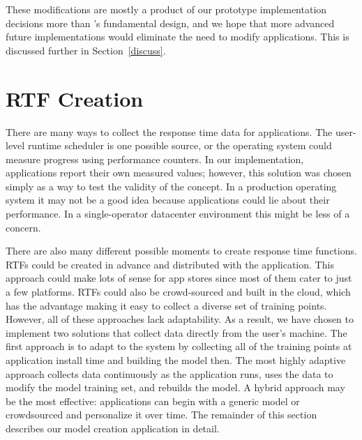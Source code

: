 These modifications are mostly a product of our prototype implementation decisions more than \pacora's fundamental design, and we hope that more advanced future implementations would eliminate the need to modify applications.   This is discussed further in Section~\ref{discuss}.

\section{RTF Creation}\label{rtf_creation}

There are many ways to collect the response time data for
applications. The user-level runtime scheduler is one possible source,
or the operating system could measure progress using performance
counters.  In our implementation, applications report their own
measured values; however, this solution was chosen simply as a way to
test the validity of the concept.  In a production operating system it
may not be a good idea because applications could lie about their
performance.  In a single-operator datacenter environment this might be less of a concern.

There are also many different possible moments to create response time functions.  RTFs could be created in advance and distributed with the application. This approach could make lots of sense for app stores since most of them cater to just a few platforms. RTFs could also be crowd-sourced and built in the cloud, which has the advantage making it easy to collect a diverse set of training points.  However, all of these approaches lack adaptability.  As a result, we have chosen to implement two solutions that collect data directly from the user's machine.  The first approach is to adapt to the system by collecting all of the training points at application install time and building the model then.  The most highly adaptive approach collects data continuously as the application runs, uses the data to modify the model training set, and rebuilds the model.  A hybrid approach may be the most effective: applications can begin with a generic model or crowdsourced and personalize it over time. The remainder of this section describes our model creation application in detail.

